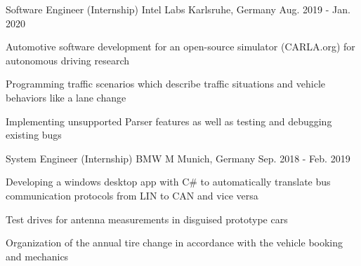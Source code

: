 \begin{cventries}
  \cventry
    {Software Engineer (Internship)} %
    {Intel Labs} %
    {Karlsruhe, Germany} %
    {Aug. 2019 - Jan. 2020} %
    {
      \begin{cvitems} %
      \item {Automotive software development for an open-source simulator (CARLA.org) for autonomous driving research}
        \item {Programming traffic scenarios which describe traffic situations and vehicle behaviors like a lane change}
        \item{Implementing unsupported Parser features as well as testing and debugging existing bugs}
      \end{cvitems}
    }

  \cventry
    {System Engineer (Internship)} %
    {BMW M} %
    {Munich, Germany} %
    {Sep. 2018 - Feb. 2019} %
    {
      \begin{cvitems} %
        \item {Developing a windows desktop app with C\# to automatically translate bus communication protocols from LIN to CAN and vice versa}
        \item {Test drives for antenna measurements in disguised prototype cars}
        \item {Organization of the annual tire change in accordance with the vehicle booking and mechanics}
      \end{cvitems}
    }
\end{cventries}
